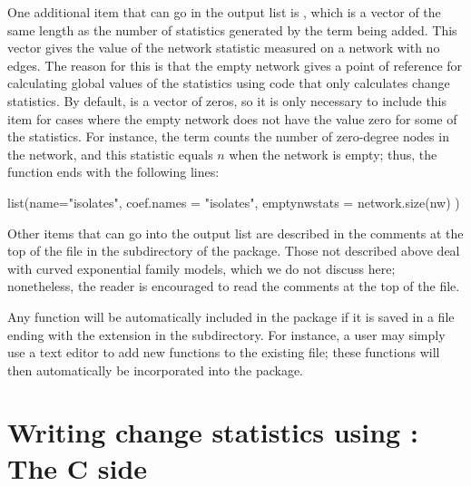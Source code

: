 \documentclass[nojss]{jss}
\begin{document}
One additional item that can go
in the output list is , which is a vector of the
same length as the number of statistics generated by the term being added.  This vector
gives the value of the network statistic measured on a network with no edges.  The reason for
this is that the empty network gives a point of reference for calculating global values of the statistics using  code that only calculates change statistics.
By default,  is a vector of zeros, so it is only necessary to include this
item for cases where the empty network does not have the value zero for some of the statistics.
For instance, the  term counts the number of zero-degree nodes in the network,
and this statistic equals $n$ when the network is empty; thus, the 
function ends with the following lines:
\begin{CodeChunk}
\begin{CodeInput}
  list(name="isolates",
       coef.names = "isolates",
       emptynwstats = network.size(nw) )
\end{CodeInput}
\end{CodeChunk}

Other items that can go into the
output list are described in the comments at the top of the
 file in the  subdirectory of the 
package.  Those not described above deal with curved exponential family models,
which we do not discuss here; nonetheless, the reader is encouraged to read the
comments at the top of the  file.

Any  function will be automatically included in the 
package if it is saved in a file ending with the extension  in the  subdirectory.
For instance, a user may simply use a text editor to add new 
functions to the existing  file; these
functions will then automatically be incorporated into the 
package.

\section[Writing change statistics using ergm.userterms:  The C side]%
{Writing change statistics using :  The C side}
\label{Cside}
\end{document}
